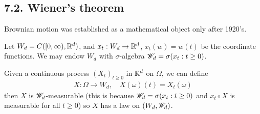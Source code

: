 \documentclass[12pt,a4paper]{report}
\begin{document}
\subsection*{7.2. Wiener's theorem}

Brownian motion was established as a mathematical object only after 1920's.
\s

Let $W_d = C([0,\infty), \mathbb{R}^d)$, and $x_t : W_d \rightarrow \mathbb{R}^d$, $x_t(w) = w(t)$ be the coordinate functions. We may endow $W_d$ with $\sigma$-algebra $\mathscr{W}_d = \sigma(x_t:t\geq 0)$. 
\s

Given a continuous process $(X_t)_{t\geq 0}$ in $\mathbb{R}^d$ on $\Omega$, we can define 
\begin{align*}
X : \Omega \rightarrow W_d, \quad X(\omega)(t) = X_t(\omega)
\end{align*}
then $X$ is $\mathscr{W}_d$-measurable (this is because $\mathscr{W}_d=\sigma(x_t:t\geq0)$ and $x_t \circ X$ is measurable for all $t\geq0$) so $X$ has a law on $(W_d, \mathscr{W}_d)$.
\s
\end{document}
